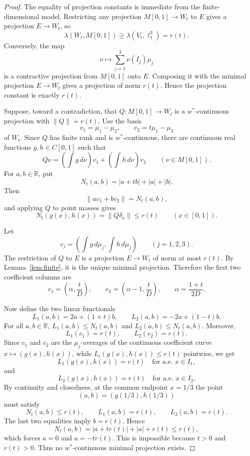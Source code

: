 \documentclass[11pt]{article}
\newcommand{\R}{\mathbb R}
\newcommand{\wstar}{w^*}
\begin{document}
\begin{proof}
The equality of projection constants is immediate from the finite-dimensional
model.  Restricting any projection \(M[0,1]\to W_t\) to \(E\) gives a
projection \(E\to W_t\), so
\[
  \lambda(W_t,M[0,1])\geq \lambda(V_t,\ell_1^3)=r(t).
\]
Conversely, the map
\[
  \nu\longmapsto \sum_{j=1}^3 \nu(I_j)\mu_j
\]
is a contractive projection from \(M[0,1]\) onto \(E\).  Composing it with the
minimal projection \(E\to W_t\) gives a projection of norm \(r(t)\).  Hence the
projection constant is exactly \(r(t)\).

Suppose, toward a contradiction, that \(Q:M[0,1]\to W_t\) is a
\(\wstar\)-continuous projection with \(\|Q\|=r(t)\).  Use the basis
\[
  v_1=\mu_1-\mu_2,\qquad v_2=t\mu_1-\mu_3
\]
of \(W_t\).  Since \(Q\) has finite rank and is \(\wstar\)-continuous, there
are continuous real functions \(g,h\in C[0,1]\) such that
\[
  Q\nu=\left(\int g\,d\nu\right)v_1+\left(\int h\,d\nu\right)v_2
  \qquad (\nu\in M[0,1]).
\]
For \(a,b\in\R\), put
\[
  N_t(a,b)=|a+tb|+|a|+|b|.
\]
Then
\[
  \|a v_1+b v_2\|=N_t(a,b),
\]
and applying \(Q\) to point masses gives
\[
  N_t(g(x),h(x))=\|Q\delta_x\|\leq r(t)\qquad (x\in[0,1]).
\]

Let
\[
  c_j=\left(\int g\,d\mu_j,\int h\,d\mu_j\right)
  \qquad (j=1,2,3).
\]
The restriction of \(Q\) to \(E\) is a projection \(E\to W_t\) of norm at most
\(r(t)\).  By Lemma~\ref{lem:finite}, it is the unique minimal projection.
Therefore the first two coefficient columns are
\[
  c_1=\left(\alpha,\frac{t}{D}\right),
  \qquad
  c_2=\left(\alpha-1,\frac{t}{D}\right),
  \qquad
  \alpha=\frac{1+t}{2D}.
\]

Now define the two linear functionals
\[
  L_1(a,b)=2a+(1+t)b,\qquad
  L_2(a,b)=-2a+(1-t)b.
\]
For all \(a,b\in\R\), \(L_1(a,b)\leq N_t(a,b)\) and
\(L_2(a,b)\leq N_t(a,b)\).  Moreover,
\[
  L_1(c_1)=r(t),\qquad L_2(c_2)=r(t).
\]
Since \(c_1\) and \(c_2\) are the \(\mu_j\)-averages of the continuous
coefficient curve \(x\mapsto (g(x),h(x))\), while \(L_i(g(x),h(x))\leq r(t)\)
pointwise, we get
\[
  L_1(g(x),h(x))=r(t)\quad\text{for a.e. }x\in I_1,
\]
and
\[
  L_2(g(x),h(x))=r(t)\quad\text{for a.e. }x\in I_2.
\]
By continuity and closedness, at the common endpoint \(x=1/3\) the point
\[
  (a,b)=(g(1/3),h(1/3))
\]
must satisfy
\[
  N_t(a,b)\leq r(t),\qquad L_1(a,b)=r(t),\qquad L_2(a,b)=r(t).
\]
The last two equalities imply \(b=r(t)\).  Hence
\[
  N_t(a,b)=|a+t r(t)|+|a|+r(t)\leq r(t),
\]
which forces \(a=0\) and \(a=-t r(t)\).  This is impossible because
\(t>0\) and \(r(t)>0\).  Thus no \(\wstar\)-continuous minimal projection
exists.
\end{proof}
\end{document}
